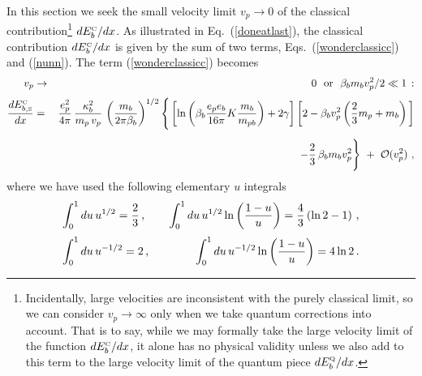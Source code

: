 \documentclass[preprint,12pt,eqsecnum,nofootinbib,amsmath,amssymb]{revtex4}
\newcommand{\smC}{{\rm\scriptscriptstyle C}}
\newcommand{\smS}{{\rm\scriptscriptstyle S}}
\newcommand{\smQ}{{\rm\scriptscriptstyle Q}}
\begin{document}
In this section we seek the small velocity limit 
$v_p \to 0$ of the classical contribution\footnote{
\tighten
Incidentally, large velocities are inconsistent  with 
the purely classical limit, so we can consider $v_p \to 
\infty$ only when we take quantum corrections into account.
That is to say, while we may formally take the large 
velocity limit of the function $dE_b^\smC/dx$, it alone
has no physical validity unless we also add to this term 
to the large velocity limit of the quantum piece $dE_b^\smQ/dx$.
}
$dE_b^\smC/dx$. 
As illustrated in Eq.~(\ref{doneatlast}), the classical 
contribution $dE_b^\smC/dx$ is given by the sum of two
terms, Eqs.~(\ref{wonderclassicc}) and (\ref{nunn}). 
The term (\ref{wonderclassicc}) becomes
\begin{eqnarray}
  v_p &\to& 0 ~~{\rm or}~~ \beta_b m_b v_p^2/2 \ll 1\, :
\nonumber\\[3pt]
{d E^\smC_{b,\smS} \over dx}   
&=&
  {e_p^2 \over 4\pi} \, 
  { \kappa_b^2 \over m_p \, v_p} \, 
  \left( { m_b \over  2\pi \beta_b } \right)^{1/2} 
  \Bigg\{
  \left[  \ln\left(\beta_b  { e_p e_b \over 16 \pi} K
  { m_b \over m_{pb} } \right)  +  2\gamma \right]
  \left[2-  \beta_b v_p^2 \left( {2\over3} m_p + m_b  \right) \,
  \right]
\nonumber\\[5pt]
  && \hskip5cm 
  - \frac{2}{3}\,\beta_b m_b v_p^2 \Bigg\} ~+~
  {\cal O}(v_p^2) \ ,
\label{wonderclassiclim}
\end{eqnarray}
where we have used the following elementary $u$ integrals
$$
  \int_0^1 du \, u^{1/2} = {2\over3} \,, \qquad
  \int_0^1 du \, u^{1/2} \ln\left( { 1 -u \over u} \right) = {4\over3} 
  \left( \ln 2 - 1 \right) \,,
$$
$$
  \int_0^1 du \, u^{-1/2} = 2 \,, \qquad\qquad
  \int_0^1 du \, u^{-1/2} \ln\left( { 1 -u \over u} \right) = 4 \ln 2  \,.
$$
\end{document}
